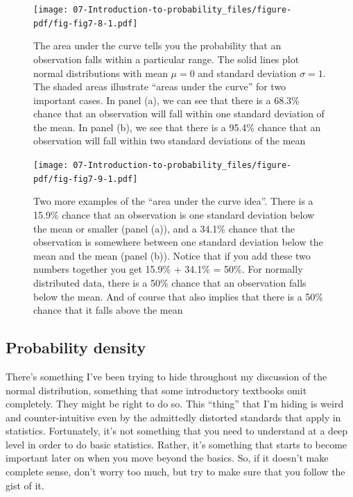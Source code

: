 \documentclass[
  a4paper,
]{book}
\begin{document}
\begin{figure}

\texttt{[image: 07-Introduction-to-probability\_files/figure-pdf/fig-fig7-8-1.pdf]} \hfill{}

\caption{\label{fig-fig7-8}The area under the curve tells you the
probability that an observation falls within a particular range. The
solid lines plot normal distributions with mean \(\mu = 0\) and standard
deviation \(\sigma = 1\). The shaded areas illustrate ``areas under the
curve'' for two important cases. In panel (a), we can see that there is
a 68.3\% chance that an observation will fall within one standard
deviation of the mean. In panel (b), we see that there is a 95.4\%
chance that an observation will fall within two standard deviations of
the mean}

\end{figure}

\begin{figure}

\texttt{[image: 07-Introduction-to-probability\_files/figure-pdf/fig-fig7-9-1.pdf]} \hfill{}

\caption{\label{fig-fig7-9}Two more examples of the ``area under the
curve idea''. There is a 15.9\% chance that an observation is one
standard deviation below the mean or smaller (panel (a)), and a 34.1\%
chance that the observation is somewhere between one standard deviation
below the mean and the mean (panel (b)). Notice that if you add these
two numbers together you get 15.9\% + 34.1\% = 50\%. For normally
distributed data, there is a 50\% chance that an observation falls below
the mean. And of course that also implies that there is a 50\% chance
that it falls above the mean}

\end{figure}

\hypertarget{probability-density}{%
\subsection{Probability density}\label{probability-density}}

There's something I've been trying to hide throughout my discussion of
the normal distribution, something that some introductory textbooks omit
completely. They might be right to do so. This ``thing'' that I'm hiding
is weird and counter-intuitive even by the admittedly distorted
standards that apply in statistics. Fortunately, it's not something that
you need to understand at a deep level in order to do basic statistics.
Rather, it's something that starts to become important later on when you
move beyond the basics. So, if it doesn't make complete sense, don't
worry too much, but try to make sure that you follow the gist of it.
\end{document}
